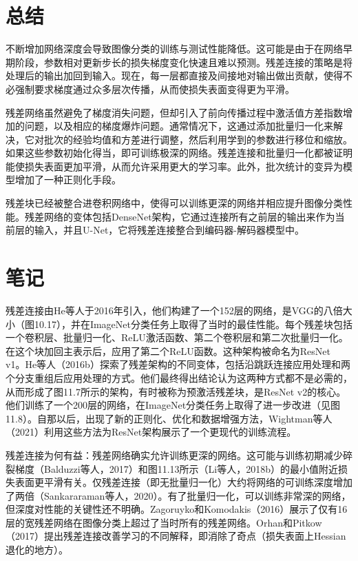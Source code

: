 \documentclass[lang=cn,newtx,10pt,scheme=chinese]{elegantbook}
\begin{document}
\section{总结}
不断增加网络深度会导致图像分类的训练与测试性能降低。这可能是由于在网络早期阶段，参数相对更新步长的损失梯度变化快速且难以预测。残差连接的策略是将处理后的输出加回到输入。现在，每一层都直接及间接地对输出做出贡献，使得不必强制要求梯度通过众多层次传播，从而使损失表面变得更为平滑。

残差网络虽然避免了梯度消失问题，但却引入了前向传播过程中激活值方差指数增加的问题，以及相应的梯度爆炸问题。通常情况下，这通过添加批量归一化来解决，它对批次的经验均值和方差进行调整，然后利用学到的参数进行移位和缩放。如果这些参数初始化得当，即可训练极深的网络。残差连接和批量归一化都被证明能使损失表面更加平滑，从而允许采用更大的学习率。此外，批次统计的变异为模型增加了一种正则化手段。

残差块已经被整合进卷积网络中，使得可以训练更深的网络并相应提升图像分类性能。残差网络的变体包括DenseNet架构，它通过连接所有之前层的输出来作为当前层的输入，并且U-Net，它将残差连接整合到编码器-解码器模型中。

\section{笔记}
残差连接由He等人于2016年引入，他们构建了一个152层的网络，是VGG的八倍大小（图10.17），并在ImageNet分类任务上取得了当时的最佳性能。每个残差块包括一个卷积层、批量归一化、ReLU激活函数、第二个卷积层和第二次批量归一化。在这个块加回主表示后，应用了第二个ReLU函数。这种架构被命名为ResNet v1。He等人（2016b）探索了残差架构的不同变体，包括沿跳跃连接应用处理和两个分支重组后应用处理的方式。他们最终得出结论认为这两种方式都不是必需的，从而形成了图11.7所示的架构，有时被称为预激活残差块，是ResNet v2的核心。他们训练了一个200层的网络，在ImageNet分类任务上取得了进一步改进（见图11.8）。自那以后，出现了新的正则化、优化和数据增强方法，Wightman等人（2021）利用这些方法为ResNet架构展示了一个更现代的训练流程。

残差连接为何有益：残差网络确实允许训练更深的网络。这可能与训练初期减少碎裂梯度（Balduzzi等人，2017）和图11.13所示（Li等人，2018b）的最小值附近损失表面更平滑有关。仅残差连接（即无批量归一化）大约将网络的可训练深度增加了两倍（Sankararaman等人，2020）。有了批量归一化，可以训练非常深的网络，但深度对性能的关键性还不明确。Zagoruyko和Komodakis（2016）展示了仅有16层的宽残差网络在图像分类上超过了当时所有的残差网络。Orhan和Pitkow（2017）提出残差连接改善学习的不同解释，即消除了奇点（损失表面上Hessian退化的地方）。
\end{document}
